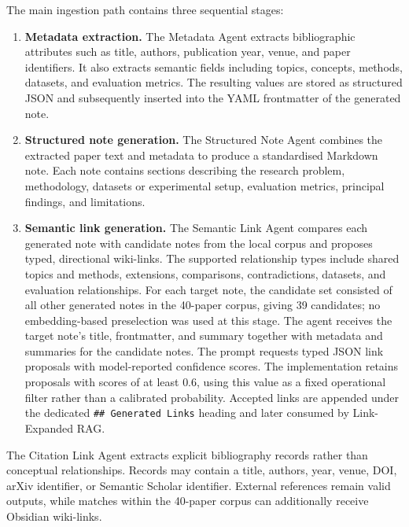 \documentclass[runningheads]{llncs}
\begin{document}
The main ingestion path contains three sequential stages:

\begin{enumerate}
    \item \textbf{Metadata extraction.}
    The Metadata Agent extracts bibliographic attributes such as title,
    authors, publication year, venue, and paper identifiers. It also
    extracts semantic fields including topics, concepts, methods,
    datasets, and evaluation metrics. The resulting values are stored as
    structured JSON and subsequently inserted into the YAML frontmatter
    of the generated note.

    \item \textbf{Structured note generation.}
    The Structured Note Agent combines the extracted paper text and
    metadata to produce a standardised Markdown note. Each note contains
    sections describing the research problem, methodology, datasets or
    experimental setup, evaluation metrics, principal findings, and
    limitations.

    \item \textbf{Semantic link generation.}
    The Semantic Link Agent compares each generated note with candidate
    notes from the local corpus and proposes typed, directional
    wiki-links. The supported relationship types include shared topics
    and methods, extensions, comparisons, contradictions, datasets, and
    evaluation relationships. For each target note, the candidate set consisted of all other
    generated notes in the 40-paper corpus, giving 39 candidates; no
    embedding-based preselection was used at this stage. The agent
    receives the target note's title, frontmatter, and summary together
    with metadata and summaries for the candidate notes. The prompt requests typed JSON link proposals with model-reported confidence scores. The implementation retains proposals with scores of
    at least \(0.6\), using this value as a fixed operational filter rather
    than a calibrated probability. Accepted links are appended under the
    dedicated \texttt{\#\# Generated Links} heading and later consumed by
    Link-Expanded RAG.
\end{enumerate}

The Citation Link Agent extracts explicit bibliography records rather
than conceptual relationships. Records may contain a title, authors,
year, venue, DOI, arXiv identifier, or Semantic Scholar identifier.
External references remain valid outputs, while matches within the
40-paper corpus can additionally receive Obsidian wiki-links.
\end{document}
